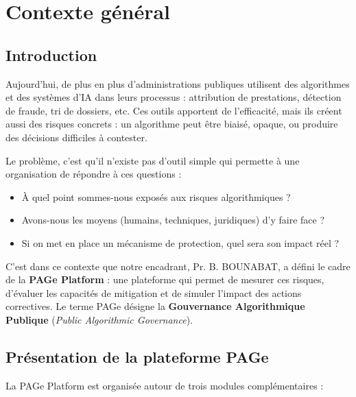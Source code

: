 \chapter{Contexte général}

\section{Introduction}
Aujourd'hui, de plus en plus d'administrations publiques utilisent des algorithmes et des systèmes d'IA dans leurs processus : attribution de prestations, détection de fraude, tri de dossiers, etc. Ces outils apportent de l'efficacité, mais ils créent aussi des risques concrets : un algorithme peut être biaisé, opaque, ou produire des décisions difficiles à contester.

Le problème, c'est qu'il n'existe pas d'outil simple qui permette à une organisation de répondre à ces questions :
\begin{itemize}
    \item À quel point sommes-nous exposés aux risques algorithmiques ?
    \item Avons-nous les moyens (humains, techniques, juridiques) d'y faire face ?
    \item Si on met en place un mécanisme de protection, quel sera son impact réel ?
\end{itemize}

C'est dans ce contexte que notre encadrant, Pr. B. BOUNABAT, a défini le cadre de la \textbf{PAGe Platform} : une plateforme qui permet de mesurer ces risques, d'évaluer les capacités de mitigation et de simuler l'impact des actions correctives. Le terme PAGe désigne la \textbf{Gouvernance Algorithmique Publique} (\textit{Public Algorithmic Governance}).

\section{Présentation de la plateforme PAGe}
La PAGe Platform est organisée autour de trois modules complémentaires :

